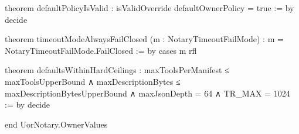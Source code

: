 \documentclass[12pt]{lexlean}
\begin{document}
\begin{lean}
theorem defaultPolicyIsValid :
    isValidOverride defaultOwnerPolicy = true := by
  decide

theorem timeoutModeAlwaysFailClosed (m : NotaryTimeoutFailMode) :
    m = NotaryTimeoutFailMode.FailClosed := by
  cases m
  rfl

theorem defaultsWithinHardCeilings :
    maxToolsPerManifest ≤ maxToolsUpperBound ∧
    maxDescriptionBytes ≤ maxDescriptionBytesUpperBound ∧
    maxJsonDepth = 64 ∧
    TR_MAX = 1024 := by
  decide

end UorNotary.OwnerValues
\end{lean}
\end{document}
